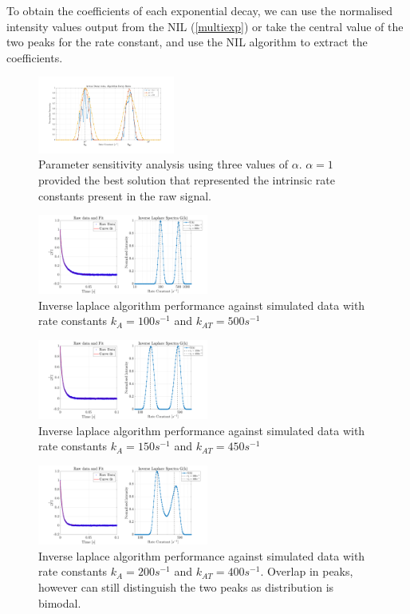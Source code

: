 To obtain the coefficients of each exponential decay, we can use the normalised intensity values output from the NIL (\autoref{multiexp}) or take the central value of the two peaks for the rate constant, and use the NIL algorithm to extract the coefficients.
\begin{figure}[H]
    \centering
    \includegraphics[width = 0.4\textwidth]{img/alpha_testing_annotate.png}
    \caption{Parameter sensitivity analysis using three values of $\alpha$. $\alpha = 1$ provided the best solution that represented the intrinsic rate constants present in the raw signal.}
    \label{alpha}
\end{figure}
\begin{figure}[H]
    \centering
    \includegraphics[width = 0.5\textwidth]{img/Inv_Laplace_results.png}
    \caption{Inverse laplace algorithm performance against simulated data with rate constants $k_{A} = 100s^{-1}$ and $k_{AT} = 500s^{-1}$}
    \label{multiexp}
\end{figure}
\begin{figure}[H]
    \centering
    \includegraphics[width = 0.5\textwidth]{img/Inv_laplace_150_450.png}
    \caption{Inverse laplace algorithm performance against simulated data with rate constants $k_{A} = 150s^{-1}$ and $k_{AT} = 450s^{-1}$}
    \label{multiexp_2}
\end{figure}
\begin{figure}[H]
    \centering
    \includegraphics[width = 0.5\textwidth]{img/Inv_laplace_200_400.png}
    \caption{Inverse laplace algorithm performance against simulated data with rate constants $k_{A} = 200s^{-1}$ and $k_{AT} = 400s^{-1}$. Overlap in peaks, however can still distinguish the two peaks as distribution is bimodal.}
    \label{multiexp_3}
\end{figure}
